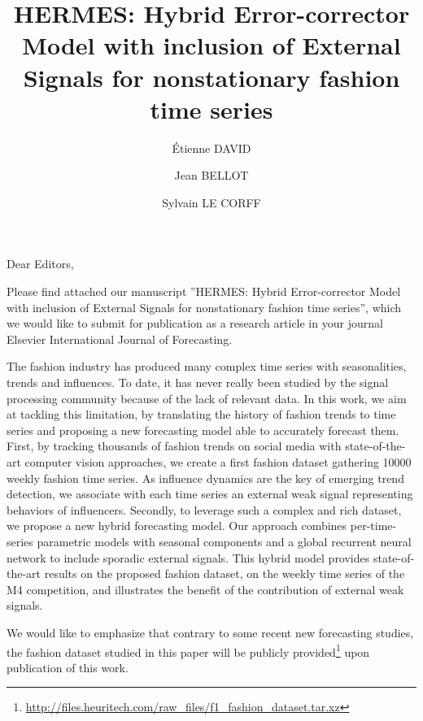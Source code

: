 \documentclass[1p]{elsarticle}
\begin{document}
\begin{frontmatter}

\title{HERMES: Hybrid Error-corrector Model with inclusion of External Signals for nonstationary fashion time series}

\author{\'Etienne DAVID}

\author{Jean BELLOT}

\author{Sylvain LE CORFF} 
\end{frontmatter}


\vspace{0.5cm}
Dear Editors,\vspace{0.5cm}

Please find attached our manuscript ”HERMES: Hybrid Error-corrector Model with inclusion of External Signals for nonstationary fashion time series”, which we
would like to submit for publication as a research article in your journal Elsevier International Journal of Forecasting. 

\medskip

The fashion industry has produced many complex time series with seasonalities, trends and influences. To date, it has never really been studied by the signal processing community because of the lack of relevant data. In this work, we  aim at tackling this limitation, by translating the history of fashion trends to time series and proposing a new forecasting model able to accurately forecast them. First, by tracking thousands of fashion trends on social media with state-of-the-art computer vision approaches, we create a first fashion dataset gathering 10000 weekly fashion time series. As influence dynamics are the key of emerging trend detection, we associate with each time series an external weak signal representing behaviors of influencers. Secondly, to leverage such a complex and rich dataset, we propose a new hybrid forecasting model. Our approach combines per-time-series parametric models with seasonal components and a global recurrent neural network to include sporadic external signals. This hybrid model provides state-of-the-art results on the proposed fashion dataset, on the weekly time series of the M4 competition, and illustrates the benefit of the contribution of external weak signals.

\medskip

We would like to emphasize that contrary to some recent new forecasting studies, the fashion dataset studied in this paper will be publicly provided\footnote[1]{\url{http://files.heuritech.com/raw_files/f1_fashion_dataset.tar.xz}} upon publication of this work.
\end{document}
